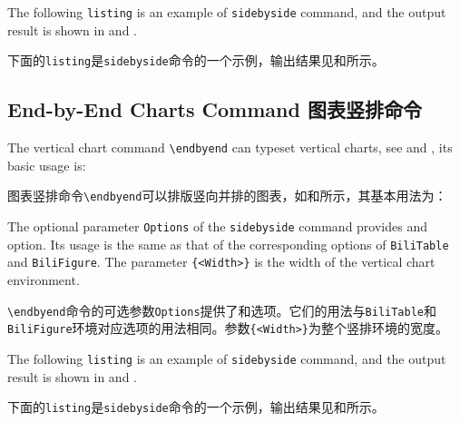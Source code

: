 \begin{ParaColumn}

    The following \verb"listing" is an example of \verb"sidebyside" command, and the output result is shown in  and .

    \switchcolumn

    下面的\verb"listing"是\verb"sidebyside"命令的一个示例，输出结果见和所示。

\end{ParaColumn}



\subsection{End-by-End Charts Command 图表竖排命令}

\begin{ParaColumn}

    The vertical chart command \verb"\endbyend" can typeset vertical charts, see  and , its basic usage is:

    \switchcolumn

    图表竖排命令\verb"\endbyend"可以排版竖向并排的图表，如和所示，其基本用法为：

\end{ParaColumn}



\begin{ParaColumn}

    The optional parameter \verb"Options" of the \verb"sidebyside" command provides  and  option.  Its usage is the same as that of the corresponding options of \verb"BiliTable" and \verb"BiliFigure". The parameter \verb"{<Width>}" is the width of the vertical chart environment.

    \switchcolumn

    \verb"\endbyend"命令的可选参数\verb"Options"提供了和选项。它们的用法与\verb"BiliTable"和\verb"BiliFigure"环境对应选项的用法相同。参数\verb"{<Width>}"为整个竖排环境的宽度。

    \switchcolumn*

    The following \verb"listing" is an example of \verb"sidebyside" command, and the output result is shown in  and .

    \switchcolumn

    下面的\verb"listing"是\verb"sidebyside"命令的一个示例，输出结果见和所示。

\end{ParaColumn}

